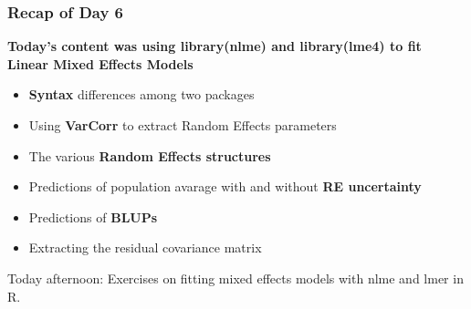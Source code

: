\documentclass{beamer}
\begin{document}
\begin{frame}
    \frametitle{Recap of Day 6}
    \textbf{Today's content was using library(nlme) and library(lme4) to fit Linear Mixed Effects Models}
    \vspace{0.5cm}
    
    \begin{itemize}
        \item \textbf{Syntax} differences among two packages
        \item Using \textbf{VarCorr} to extract Random Effects parameters
        \item The various \textbf{Random Effects structures}
        \item Predictions of population avarage with and without \textbf{RE uncertainty}
        \item Predictions of \textbf{BLUPs}
        \item Extracting the residual covariance matrix
    \end{itemize}
    \vspace{0.5cm}
    
    Today afternoon: Exercises on fitting mixed effects models with nlme and lmer in R.
\end{frame}
\end{document}
